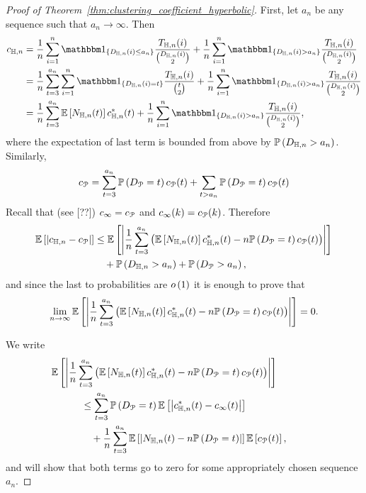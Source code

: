 \begin{proof}[Proof of Theorem~\ref{thm:clustering_coefficient_hyperbolic}]

First, let $a_n$ be any sequence such that $a_n \to \infty$. Then
\begin{align*}
	c_{\H,n} &= \frac{1}{n} \sum_{i = 1}^n \ind{D_{\H,n}(i) \le a_n} \frac{T_{\H,n}(i)}{\binom{D_{\H,n}(i)}{2}}
		+ \frac{1}{n} \sum_{i = 1}^n \ind{D_{\H,n}(i) > a_n} \frac{T_{\H,n}(i)}{\binom{D_{\H,n}(i)}{2}}\\
	&= \frac{1}{n} \sum_{t = 3}^{a_n} \sum_{i = 1}^n \ind{D_{\H,n}(i) = t} \frac{T_{\H,n}(i)}{\binom{t}{2}}
		+ \frac{1}{n} \sum_{i = 1}^n \ind{D_{\H,n}(i) > a_n} \frac{T_{\H,n}(i)}{\binom{D_{\H,n}(i)}{2}}\\
	&= \frac{1}{n} \sum_{t = 3}^{a_n} \Exp{N_{\H,n}(t)} c_{\H,n}^\ast(t)
		+ \frac{1}{n} \sum_{i = 1}^n \ind{D_{\H,n}(i) > a_n} \frac{T_{\H,n}(i)}{\binom{D_{\H,n}(i)}{2}},
\end{align*}
where the expectation of last term is bounded from above by $\mathbb{P}\left(D_{\mathbb{H},n} > a_n\right)$. Similarly,
\[
	c_{{\mathcal P}} = \sum_{t = 3}^{a_n} \mathbb{P}\left(D_{{\mathcal P}} = t\right) c_{{\mathcal P}}(t) + \sum_{t > a_n} \mathbb{P}\left(D_{{\mathcal P}} = t\right) c_{{\mathcal P}}(t)
\]
Recall that (see [??]) $c_\infty = c_{{\mathcal P}}$ and $c_\infty(k) = c_{{\mathcal P}}(k)$. Therefore
\begin{align*}
	\mathbb{E}\left[|c_{\mathbb{H},n} - c_{{\mathcal P}}|\right]
	&\le \mathbb{E}\left[\left|\frac{1}{n} \sum_{t = 3}^{a_n} \left(\mathbb{E}\left[N_{\mathbb{H},n}(t)\right] c_{\mathbb{H},n}^\ast(t) - 	
		n \mathbb{P}\left(D_{{\mathcal P}} = t\right)c_{{\mathcal P}}(t)\right)\right|\right]\\ 
	&\hspace{10pt}+ \mathbb{P}\left(D_{\mathbb{H},n} > a_n\right) + \mathbb{P}\left(D_{{\mathcal P}} > a_n\right),
\end{align*}
and since the last to probabilities are $o\left(1\right)$ it is enough to prove that
\[
	\lim_{n \to \infty} \mathbb{E}\left[\left|\frac{1}{n} \sum_{t = 3}^{a_n} \left(\mathbb{E}\left[N_{\mathbb{H},n}(t)\right] c_{\mathbb{H},n}^\ast(t) - 	
			n \mathbb{P}\left(D_{{\mathcal P}} = t\right)c_{{\mathcal P}}(t)\right)\right|\right] = 0.
\]

We write
\begin{align*}
	&\hspace{-30pt}\Exp{\left|\frac{1}{n} \sum_{t = 3}^{a_n} \left(\Exp{N_{\H,n}(t)} c_{\H,n}^\ast(t) - 	
		n \Prob{D_\Pcal = t}c_\Pcal(t)\right)\right|}\\
	&\le \sum_{t = 3}^{a_n} \Prob{D_\Pcal = t} \Exp{\left|c_{\H,n}^\ast(t) - c_{\infty}(t)\right|}\\
	&\hspace{10pt}+ \frac{1}{n} \sum_{t = 3}^{a_n} \Exp{\left|N_{\H,n}(t) - n \Prob{D_\Pcal = t}\right|}\Exp{c_\Pcal(t)},
\end{align*}
and will show that both terms go to zero for some appropriately chosen sequence $a_n$.


\end{proof}
